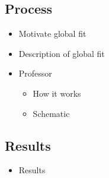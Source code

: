 \subsection{Process}
\begin{itemize}
    \item Motivate global fit
    \item Description of global fit
    \item Professor
    \begin{itemize}
        \item How it works
        \item Schematic
    \end{itemize}
\end{itemize}

\subsection{Results}
\begin{itemize}
    \item Results 
\end{itemize}



\clearpage
